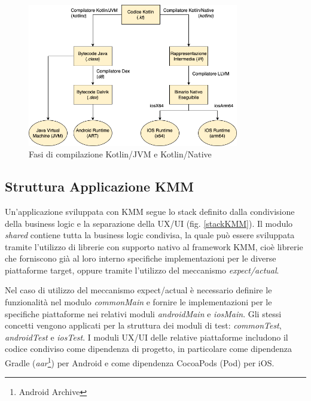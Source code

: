 \begin{figure}[H]
    \centering
    \includegraphics[width=0.82\textwidth]{img/compilatore_kotlin.png}
    \caption{Fasi di compilazione Kotlin/JVM e Kotlin/Native}
    \label{kotlin-native-compile}
\end{figure}

\subsection{Struttura Applicazione KMM}
Un'applicazione sviluppata con KMM segue lo stack definito dalla condivisione della business logic e la separazione della UX/UI (fig. \ref{stackKMM}). 
Il modulo \textit{shared} contiene tutta la business logic condivisa, 
la quale può essere sviluppata tramite l'utilizzo di librerie con supporto nativo al framework KMM, 
cioè librerie che forniscono già al loro interno specifiche implementazioni per le diverse piattaforme target, 
oppure tramite l'utilizzo del meccanismo \textit{expect/actual}.

Nel caso di utilizzo del meccanismo expect/actual è necessario definire le funzionalità nel modulo \textit{commonMain} e fornire le implementazioni per le specifiche piattaforme nei relativi moduli \textit{androidMain} e \textit{iosMain}. 
Gli stessi concetti vengono applicati per la struttura dei moduli di test: \textit{commonTest}, \textit{androidTest} e \textit{iosTest}. 
I moduli UX/UI delle relative piattaforme includono il codice condiviso come dipendenza di progetto, 
in particolare come dipendenza Gradle (\textit{aar}\footnote{Android Archive}) per Android e come dipendenza CocoaPods (Pod) per iOS.

